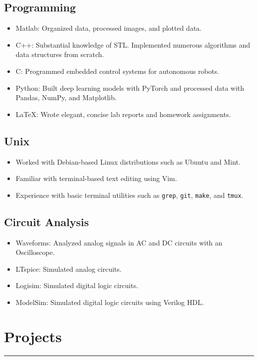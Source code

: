 \documentclass[10pt, letterpaper]{article}
\begin{document}
\subsection*{Programming}
\begin{itemize}[noitemsep]
	\item Matlab: Organized data, processed images, and plotted data.
	\item C++: Substantial knowledge of STL. Implemented numerous algorithms and data structures from scratch.
	\item C: Programmed embedded control systems for autonomous robots.
	\item Python: Built deep learning models with PyTorch and processed data with Pandas, NumPy, and Matplotlib.
	\item \LaTeX: Wrote elegant, concise lab reports and homework assignments.
\end{itemize}

\subsection*{Unix}
\begin{itemize}[noitemsep]
	\item Worked with Debian-based Linux distributions such as Ubuntu and Mint.
	\item Familiar with terminal-based text editing using Vim.
	\item Experience with basic terminal utilities such as \lstinline{grep}, \lstinline{git}, \lstinline{make}, and \lstinline{tmux}.
\end{itemize}

\subsection*{Circuit Analysis}
\begin{itemize}[noitemsep]
	\item Waveforms: Analyzed analog signals in AC and DC circuits with an Oscilloscope.	
	\item LTspice: Simulated analog circuits.
	\item Logisim: Simulated digital logic circuits.
	\item ModelSim: Simulated digital logic circuits using Verilog HDL.
\end{itemize}

\section*{Projects}
\hrule
\vspace{3pt}
\end{document}

